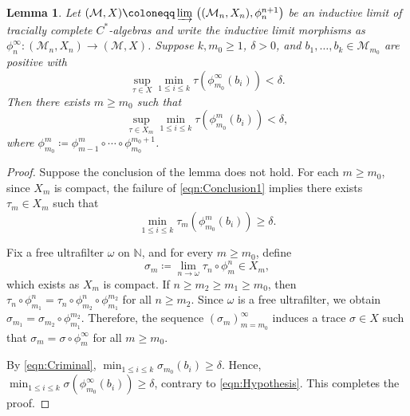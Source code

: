\documentclass[a4paper,11pt]{amsart}
\newtheorem{lemma}[theorem]{Lemma}
\theoremstyle{definition}
\numberwithin{equation}{section}
\numberwithin{theorem}{section}
\newcommand{\M}{\mathcal{M}}
\begin{document}
\begin{lemma}\label{lem:Technical}
	Let $(\M, X) \coloneqq \varinjlim\, \big((\M_n,X_n),\phi_n^{n+1}\big)$ be an inductive limit of tracially complete $C^*$-algebras and write the inductive limit morphisms as $\phi_n^\infty\colon (\M_n,X_n) \rightarrow (\M, X)$.  Suppose $k, m_0 \geq 1$, $\delta > 0$, and $b_1,\ldots,b_k \in \M_{m_0}$ are positive with
	\begin{equation}\label{eqn:Hypothesis}
		\sup_{\tau \in X} \min_{1 \leq i \leq k} \tau(\phi_{m_0}^\infty(b_i)) < \delta.
	\end{equation}
	Then there exists $m \geq m_0$ such that
	\begin{equation}\label{eqn:Conclusion1}
		\sup_{\tau \in X_m} \min_{1 \leq i \leq k} \tau(\phi_{m_0}^m(b_i)) < \delta,
	\end{equation}
	where $\phi_{m_0}^m \coloneqq \phi_{m-1}^{m} \circ \cdots \circ \phi_{m_0}^{m_0+1}$.
\end{lemma}

\begin{proof}
	Suppose the conclusion of the lemma does not hold.  For each $m \geq m_0$, since $X_m$ is compact, the failure of \eqref{eqn:Conclusion1} implies there exists $\tau_m \in X_m$ such that
	\begin{equation}
		\min_{1 \leq i \leq k} \tau_m (\phi_{m_0}^m(b_i)) \geq \delta \label{eqn:Criminal}.
	\end{equation}
	
	Fix a free ultrafilter $\omega$ on $\mathbb N$, and for every $m \geq m_0$, define 
	\begin{equation}
		\sigma_m \coloneqq \lim_{n \rightarrow \omega} \tau_n \circ \phi_m^n \in X_m,
	\end{equation} 
	which exists as $X_m$ is compact.  If $n\geq m_2 \geq m_1 \geq m_0$, then $\tau_n \circ \phi_{m_1}^n = \tau_n \circ \phi_{m_2}^n \circ \phi_{m_1}^{m_2}$ for all $n \geq m_2$. Since $\omega$ is a free ultrafilter, we obtain $\sigma_{m_1} = \sigma_{m_2} \circ \phi_{m_1}^{m_2}$. Therefore, the sequence $(\sigma_m)_{m=m_0}^\infty$ induces a trace $\sigma \in X$ such that $\sigma_m = \sigma \circ \phi^{\infty}_m$ for all $m \geq m_0$.
	
	By \eqref{eqn:Criminal}, $\min_{1 \leq i \leq k} \sigma_{m_0}(b_i) \geq \delta$. Hence, $\min_{1\leq i\leq k}\sigma(\phi_{m_0}^\infty(b_i)) \geq \delta$, contrary to \eqref{eqn:Hypothesis}. This completes the proof.
\end{proof}
\end{document}
